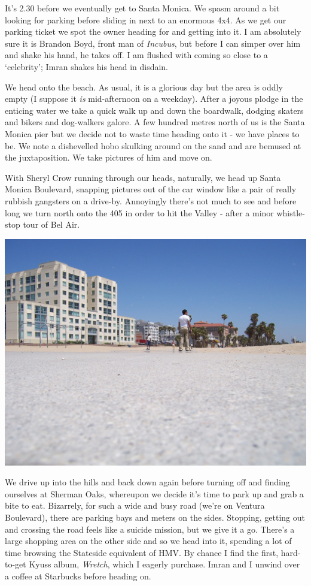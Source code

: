 \documentclass[a5paper,titlepage,11pt]{book}
\begin{document}
It's 2.30 before we eventually get to Santa Monica. We spasm around a bit looking for parking before sliding in next to an enormous 4x4. As we get our parking ticket we spot the owner heading for and getting into it. I am absolutely sure it is Brandon Boyd, front man of \emph{Incubus}, but before I can simper over him and shake his hand, he takes off. I am flushed with coming so close to a `celebrity'; Imran shakes his head in disdain.

We head onto the beach. As usual, it is a glorious day but the area is oddly empty (I suppose it \emph{is} mid-afternoon on a weekday). After a joyous plodge in the enticing water we take a quick walk up and down the boardwalk, dodging skaters and bikers and dog-walkers galore. A few hundred metres north of us is the Santa Monica pier but we decide not to waste time heading onto it - we have places to be. We note a dishevelled hobo skulking around on the sand and are bemused at the juxtaposition. We take pictures of him and move on.

With Sheryl Crow running through our heads, naturally, we head up Santa Monica Boulevard, snapping pictures out of the car window like a pair of really rubbish gangsters on a drive-by. Annoyingly there's not much to see and before long we turn north onto the 405 in order to hit the Valley - after a minor whistle-stop tour of Bel Air.

\begin{center}\includegraphics[width=\textwidth]{gfx/100_1735}\end{center}

We drive up into the hills and back down again before turning off and finding ourselves at Sherman Oaks, whereupon we decide it's time to park up and grab a bite to eat. Bizarrely, for such a wide and busy road (we're on Ventura Boulevard), there are parking bays and meters on the sides. Stopping, getting out and crossing the road feels like a suicide mission, but we give it a go. There's a large shopping area on the other side and so we head into it, spending a lot of time browsing the Stateside equivalent of HMV. By chance I find the first, hard-to-get Kyuss album, \emph{Wretch}, which I eagerly purchase. Imran and I unwind over a coffee at Starbucks before heading on.
\end{document}
